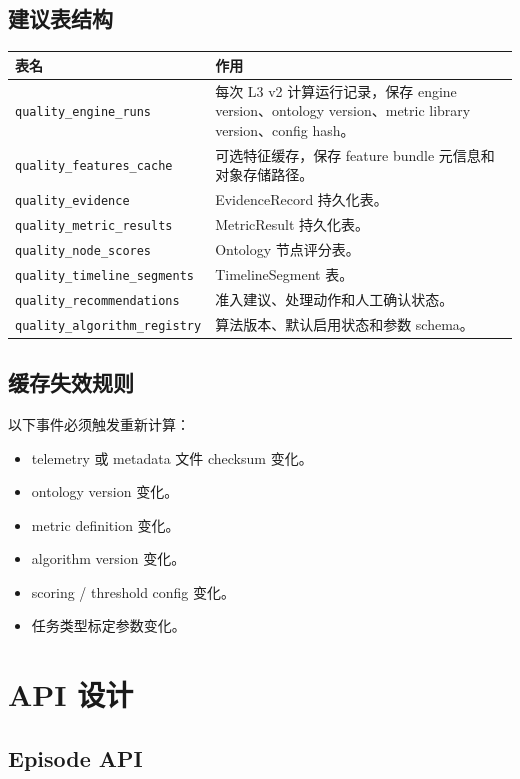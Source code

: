 \documentclass[UTF8,zihao=-4,oneside,openany]{ctexrep}
\newcommand{\Code}[1]{\texttt{#1}}
\begin{document}
\subsection{建议表结构}

\begin{longtable}{L{4cm} L{9.5cm}}
\toprule
表名 & 作用 \\
\midrule
\Code{quality\_engine\_runs} & 每次 L3 v2 计算运行记录，保存 engine version、ontology version、metric library version、config hash。 \\
\Code{quality\_features\_cache} & 可选特征缓存，保存 feature bundle 元信息和对象存储路径。 \\
\Code{quality\_evidence} & EvidenceRecord 持久化表。 \\
\Code{quality\_metric\_results} & MetricResult 持久化表。 \\
\Code{quality\_node\_scores} & Ontology 节点评分表。 \\
\Code{quality\_timeline\_segments} & TimelineSegment 表。 \\
\Code{quality\_recommendations} & 准入建议、处理动作和人工确认状态。 \\
\Code{quality\_algorithm\_registry} & 算法版本、默认启用状态和参数 schema。 \\
\bottomrule
\end{longtable}

\subsection{缓存失效规则}

以下事件必须触发重新计算：

\begin{itemize}
\item telemetry 或 metadata 文件 checksum 变化。
\item ontology version 变化。
\item metric definition 变化。
\item algorithm version 变化。
\item scoring / threshold config 变化。
\item 任务类型标定参数变化。
\end{itemize}

\section{API 设计}

\subsection{Episode API}
\end{document}
